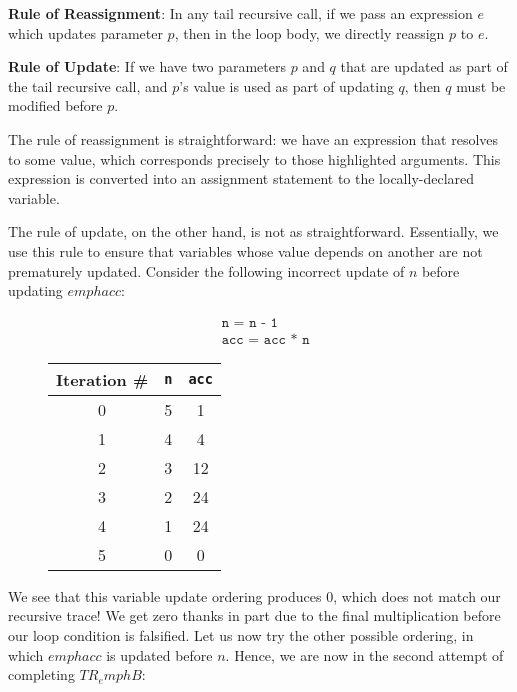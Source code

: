 \textbf{Rule of Reassignment}: In any tail recursive call, if we pass an expression $e$ which updates parameter $p$, then in the loop body, we directly reassign $p$ to $e$.

\textbf{Rule of Update}: If we have two parameters $p$ and $q$ that are updated as part of the tail recursive call, and $p$'s value is used as part of updating $q$, then $q$ must be modified before $p$.

The rule of reassignment is straightforward: we have an expression that resolves to some value, which corresponds precisely to those highlighted arguments. This expression is converted into an assignment statement to the locally-declared variable. 

The rule of update, on the other hand, is not as straightforward. Essentially, we use this rule to ensure that variables whose value depends on another are not prematurely updated. Consider the following incorrect update of $n$ before updating $emph{acc}$:
\begin{figure}[H]
\centering
\begin{minipage}{.4\textwidth}
  \begin{align*}
  &\texttt{n = n - 1}\\
  &\texttt{acc = acc * n}
  \end{align*}
\end{minipage}%
\begin{minipage}{.4\textwidth}
\begin{tabular}{c|c|c}
Iteration \# & \texttt{n} & \texttt{acc}\\
\hline
\hline
0 & 5 & 1\\
\hline
1 & 4 & 4\\
\hline
2 & 3 & 12\\
\hline
3 & 2 & 24\\
\hline
4 & 1 & 24\\
\hline
5 & 0 & 0\\
\end{tabular}
\end{minipage}
\end{figure}
We see that this variable update ordering produces $0$, which does not match our recursive trace! We get zero thanks in part due to the final multiplication before our loop condition is falsified. Let us now try the other possible ordering, in which $emph{acc}$ is updated before $n$. Hence, we are now in the second attempt of completing $TR_emph{B}$:
